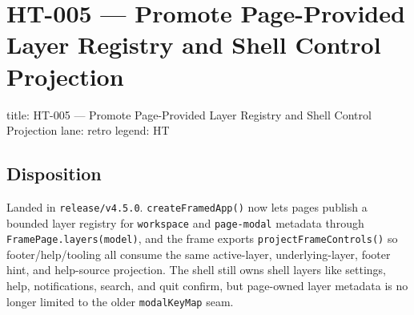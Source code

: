\chapter{HT-005 --- Promote Page-Provided Layer Registry and Shell Control Projection}\label{record-352}

\smallskip

\begin{RecordMeta}
title: HT-005 — Promote Page-Provided Layer Registry and Shell Control Projection
lane: retro
legend: HT

\end{RecordMeta}

\section{Disposition}\label{record-352-disposition}

Landed in \texttt{r\allowbreak{}e\allowbreak{}l\allowbreak{}e\allowbreak{}a\allowbreak{}s\allowbreak{}e\allowbreak{}/\allowbreak{}v\allowbreak{}4\allowbreak{}.\allowbreak{}5\allowbreak{}.\allowbreak{}0}. \texttt{c\allowbreak{}r\allowbreak{}e\allowbreak{}a\allowbreak{}t\allowbreak{}e\allowbreak{}F\allowbreak{}r\allowbreak{}a\allowbreak{}m\allowbreak{}e\allowbreak{}d\allowbreak{}A\allowbreak{}p\allowbreak{}p\allowbreak{}(\allowbreak{})} now lets pages publish a bounded layer registry for \texttt{w\allowbreak{}o\allowbreak{}r\allowbreak{}k\allowbreak{}s\allowbreak{}p\allowbreak{}a\allowbreak{}c\allowbreak{}e} and \texttt{p\allowbreak{}a\allowbreak{}g\allowbreak{}e\allowbreak{}-\allowbreak{}m\allowbreak{}o\allowbreak{}d\allowbreak{}a\allowbreak{}l} metadata through \texttt{F\allowbreak{}r\allowbreak{}a\allowbreak{}m\allowbreak{}e\allowbreak{}P\allowbreak{}a\allowbreak{}g\allowbreak{}e\allowbreak{}.\allowbreak{}l\allowbreak{}a\allowbreak{}y\allowbreak{}e\allowbreak{}r\allowbreak{}s\allowbreak{}(\allowbreak{}m\allowbreak{}o\allowbreak{}d\allowbreak{}e\allowbreak{}l\allowbreak{})}, and the frame exports \texttt{p\allowbreak{}r\allowbreak{}o\allowbreak{}j\allowbreak{}e\allowbreak{}c\allowbreak{}t\allowbreak{}F\allowbreak{}r\allowbreak{}a\allowbreak{}m\allowbreak{}e\allowbreak{}C\allowbreak{}o\allowbreak{}n\allowbreak{}t\allowbreak{}r\allowbreak{}o\allowbreak{}l\allowbreak{}s\allowbreak{}(\allowbreak{})} so footer/help/tooling all consume the same active-layer, underlying-layer, footer hint, and help-source projection. The shell still owns shell layers like settings, help, notifications, search, and quit confirm, but page-owned layer metadata is no longer limited to the older \texttt{m\allowbreak{}o\allowbreak{}d\allowbreak{}a\allowbreak{}l\allowbreak{}K\allowbreak{}e\allowbreak{}y\allowbreak{}M\allowbreak{}a\allowbreak{}p} seam.

